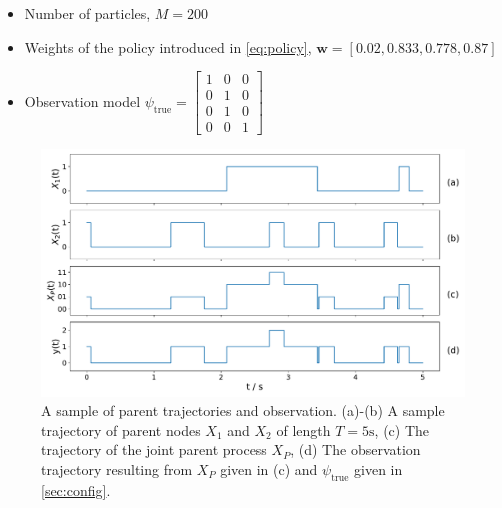 \begin{itemize}
	\item Number of particles, $ M = 200 $
	\item Weights of the policy introduced in \autoref{eq:policy}, $ \textbf{w} = [0.02, 0.833, 0.778, 0.87] $
	\item Observation model
	$\psi_{\text{true}} =
	\begin{bmatrix}
		1 & 0 & 0 \\
		0 & 1 & 0 \\
		0 & 1 & 0 \\
		0 & 0 & 1
	\end{bmatrix}$
\end{itemize}
\begin{figure}[t]
	\begin{center}
		\includegraphics[width=.90\textwidth]{figures/sim_example/parent_traj}
		\caption[Parent trajectories and observation]{A sample of parent trajectories and observation. (a)-(b) A sample trajectory of parent nodes $ X_1 $ and $ X_2 $ of length $ T=5\text{s} $, (c) The trajectory of the joint parent process $ X_P $, (d) The observation trajectory resulting from $ X_P $ given in (c) and $ \psi_{\text{true}} $ given in \cref{sec:config}.}
		\label{fig:parent_traj}
	\end{center}
\end{figure}
